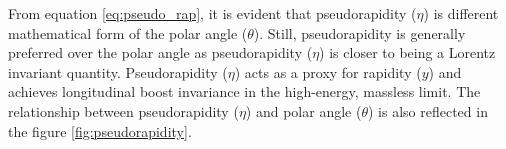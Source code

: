 From equation \ref{eq:pseudo_rap}, it is evident that pseudorapidity ($\eta$) is different mathematical form of the polar angle ($\theta$). Still, pseudorapidity is generally preferred over the polar angle as pseudorapidity ($\eta$) is closer to being a Lorentz invariant quantity. Pseudorapidity ($\eta$) acts as a proxy for rapidity ($y$) and achieves longitudinal boost invariance in the high-energy, massless limit. The relationship between pseudorapidity ($\eta$) and polar angle ($\theta$) is also reflected in the figure \ref{fig:pseudorapidity}.


